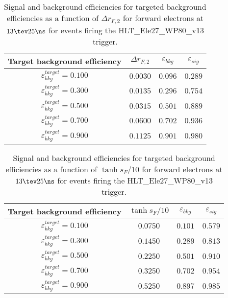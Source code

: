 \clearpage

\begin{table}[!bht]
  \begin{center}
    \begin{tabular}{cccc}
      \hline
      Target background efficiency & $\Delta r_{F,2}$ & $\varepsilon_{bkg}$ & $\varepsilon_{sig}$ \\ 
      \hline
      $\varepsilon_{bkg}^{target} = 0.100$ & $  0.0030$ & $0.096$ & $0.289$ \\
      $\varepsilon_{bkg}^{target} = 0.300$ & $  0.0135$ & $0.296$ & $0.754$ \\
      $\varepsilon_{bkg}^{target} = 0.500$ & $  0.0315$ & $0.501$ & $0.889$ \\
      $\varepsilon_{bkg}^{target} = 0.700$ & $  0.0600$ & $0.702$ & $0.936$ \\
      $\varepsilon_{bkg}^{target} = 0.900$ & $  0.1125$ & $0.901$ & $0.980$ \\
      \hline
    \end{tabular}
    \caption{Signal and background efficiencies for targeted background efficiencies as a function of $\Delta r_{F,2}$ for forward electrons at $13\tev 25\ns$ for events firing the HLT\_Ele27\_WP80\_v13 trigger.}
    \label{tab:eff_rej_r2F_beam_13_25_trigger_27_F}
  \end{center}
\end{table}

\clearpage

\begin{table}[!bht]
  \begin{center}
    \begin{tabular}{cccc}
      \hline
      Target background efficiency & $\tanh{s_F/10}$ & $\varepsilon_{bkg}$ & $\varepsilon_{sig}$ \\ 
      \hline
      $\varepsilon_{bkg}^{target} = 0.100$ & $  0.0750$ & $0.101$ & $0.579$ \\
      $\varepsilon_{bkg}^{target} = 0.300$ & $  0.1450$ & $0.289$ & $0.813$ \\
      $\varepsilon_{bkg}^{target} = 0.500$ & $  0.2250$ & $0.501$ & $0.910$ \\
      $\varepsilon_{bkg}^{target} = 0.700$ & $  0.3250$ & $0.702$ & $0.954$ \\
      $\varepsilon_{bkg}^{target} = 0.900$ & $  0.5250$ & $0.897$ & $0.985$ \\
      \hline
    \end{tabular}
    \caption{Signal and background efficiencies for targeted background efficiencies as a function of $\tanh{s_F/10}$ for forward electrons at $13\tev 25\ns$ for events firing the HLT\_Ele27\_WP80\_v13 trigger.}
    \label{tab:eff_rej_sF_beam_13_25_trigger_27_F}
  \end{center}
\end{table}

\clearpage